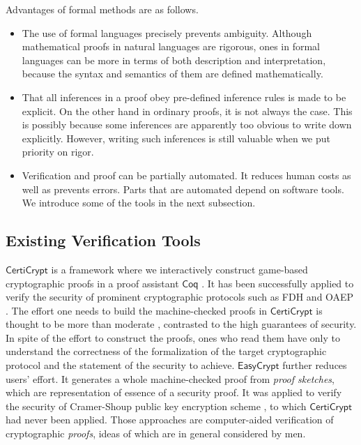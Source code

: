Advantages of formal methods are as follows.
\begin{itemize}
 \item The use of formal languages precisely prevents ambiguity.
       Although mathematical proofs in natural languages are rigorous,
       ones in formal languages can be 
       more in terms of both description and interpretation,
       because the syntax and
       semantics of them are defined mathematically.
 \item That all inferences in a proof obey
       pre-defined inference rules is made to be explicit.
       On the other hand in ordinary proofs,
       it is not always the case. This is possibly because
       some inferences are apparently too obvious to write down
       explicitly. However, writing such inferences is still valuable
       when we put priority on rigor.
 \item Verification and proof can be partially automated.
       It reduces human costs as well as prevents errors.
       Parts that are automated depend on software tools.
       We introduce some of the tools in the next subsection.
\end{itemize}

\subsection{Existing Verification Tools}
\label{intro:tools}
$\mathsf{CertiCrypt}$ \cite{Barthe2009certi}
is a framework where we interactively construct
game-based cryptographic proofs in a proof assistant
$\mathsf{Coq}$ \cite{coq2010}. It has been 
successfully applied to
verify the security of prominent cryptographic protocols such as 
FDH \cite{Zanella2009FDH} and OAEP \cite{Barthe2011OAEP}.
The effort one needs to
build the machine-checked proofs in $\mathsf{CertiCrypt}$ 
is thought to be more than moderate \cite{Barthe2011}, 
contrasted to the high guarantees
of security. In spite of the effort to construct the proofs,
ones who read them have
only to understand the correctness of the formalization of
the target cryptographic protocol and the statement of the security to
achieve.
$\mathsf{EasyCrypt}$ \cite{Barthe2011} further
reduces users' effort. It generates
a whole machine-checked proof from {\it proof sketches}, which are
representation of essence of a security proof. It was 
applied to verify the security of Cramer-Shoup public key encryption
scheme \cite{CramerShoup1998}, to which $\mathsf{CertiCrypt}$ had
never been applied. Those approaches are
computer-aided verification of cryptographic {\it proofs},
ideas of which are in general considered by men.

